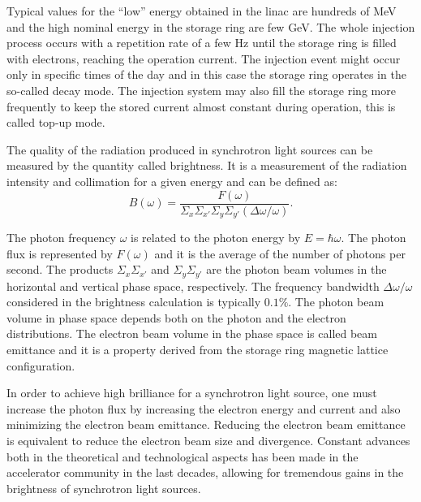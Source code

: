 Typical values for the ``low'' energy obtained in the \gls{linac} are hundreds of \si{\mega\electronvolt} and the high nominal energy in the storage ring are few \si{\giga\electronvolt}. The whole injection process occurs with a repetition rate of a few \si{\hertz} until the storage ring is filled with electrons, reaching the operation current. The injection event might occur only in specific times of the day and in this case the storage ring operates in the so-called decay mode. The injection system may also fill the storage ring more frequently to keep the stored current almost constant during operation, this is called top-up mode.

The quality of the radiation produced in synchrotron light sources can be measured by the quantity called brightness. It is a measurement of the radiation intensity and collimation for a given energy and can be defined as:
\begin{equation}
    B(\omega) = \dfrac{F(\omega)}{\Sigma_x \Sigma_{x'} \Sigma_y \Sigma_{y'} \left(\Delta \omega /\omega\right)}.
\end{equation}

The photon frequency $\omega$ is related to the photon energy by $E = \hbar \omega$. The photon flux is represented by $F(\omega)$ and it is the average of the number of photons per second. The products $\Sigma_x \Sigma_{x'}$ and $\Sigma_y\Sigma_{y'}$ are the photon beam volumes in the horizontal and vertical phase space, respectively. The frequency bandwidth $\Delta \omega/\omega$ considered in the brightness calculation is typically $0.1\%$. The photon beam volume in phase space depends both on the photon and the electron distributions. The electron beam volume in the phase space is called beam emittance and it is a property derived from the storage ring magnetic lattice configuration. 

In order to achieve high brilliance for a synchrotron light source, one must increase the photon flux by increasing the electron energy and current and also minimizing the electron beam emittance. Reducing the electron beam emittance is equivalent to reduce the electron beam size and divergence. Constant advances both in the theoretical and technological aspects has been made in the accelerator community in the last decades, allowing for tremendous gains in the brightness of synchrotron light sources. 

